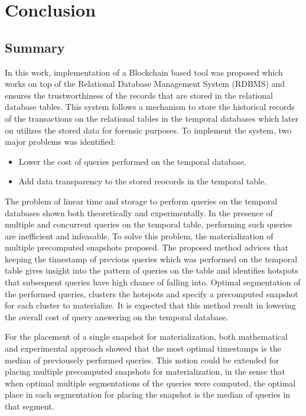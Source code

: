 \chapter{Conclusion}

	\section{Summary}
		In this work, implementation of a Blockchain based tool was proposed which works on top of the Relational Database Management System (RDBMS) and ensures the trustworthiness of the records that are stored in the relational database tables. This system follows a mechanism to store the historical records of the transactions on the relational tables in the temporal databases which later on utilizes the stored data for forensic purposes. To implement the system, two major problems was identified: 
		\begin{itemize}
			\item Lower the cost of queries performed on the temporal database.
			\item Add data transparency to the stored reocords in the temporal table.
		\end{itemize}

		The problem of linear time and storage to perform queries on the temporal databases shown both theoretically and experimentally. In the presence of multiple and concurrent queries on the temporal table, performing such queries are inefficient and infeasable. To solve this problem, the materialization of multiple precomputed snapshots proposed. The proposed method advices that keeping the timestamp of previous queries which was performed on the temporal table
		gives insight into the pattern of queries on the table and identifies hotspots that subsequent queries have high chance of falling into. Optimal segmentation of the performed queries, clusters the hotspots and specify a precomputed snapshot for each cluster to materialize. It is expected that this method result in lowering the overall cost of query answering on the temporal database.

		For the placement of a single snapshot for materialization, both mathematical and experimental approach showed that the most optimal timestamps is the median of previousely performed queries. This notion could be extended for placing multiple precomputed snapshots for materialization, in the sense that when optimal multiple segmentations of the queries were computed, the optimal place in each segmentation for placing the snapshot is the median of queries in that segment.

